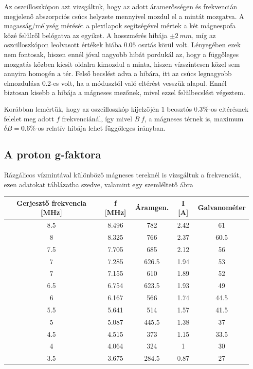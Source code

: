 \documentclass[a4paper,12pt]{article}
\begin{document}
\par Az oszcilloszkópon azt vizsgáltuk, hogy az adott áramerősségen és frekvencián megjelenő abszorpciós csúcs helyzete mennyivel mozdul el a mintát mozgatva. A magasság/mélység mérését a plexilapok segítségével mértek a két mágnespofa közé felülről belógatva az egyiket. A hosszmérés hibája $\pm 2 ~mm$, míg az oszcilloszkópon leolvasott értékek hiába $0.05$ osztás körül volt. Lényegében ezek nem fontosak, hiszen ennél jóval nagyobb hibát pordukál az, hogy a függőleges mozgatás közben kicsit oldalra kimozdul a minta, hiszen vízszintesen közel sem annyira homogén a tér. Felső becslést adva a hibára, itt az csúcs legnagyobb elmozdulása $0.2$-es volt, ha a módusztól való eltérést vesszük alapul. Ennél biztosan kisebb a hibája a mágneses mezőnek, mivel ezzel felülbecslést végeztem.
\par Korábban lemértük, hogy az oszcilloszkóp kijelzőjén 1 beosztós $0.3 \%$-os eltérésnek felelet meg adott $f$ frekvenciánál, így mivel $B ~ f$, a mágneses térnek is, maximum $\delta B = 0.6 \%$-os relatív hibája lehet függőleges irányban.

\subsection{ A proton g-faktora}

\par Rázgálicos vízmintával különböző mágneses tereknél is vizsgáltuk a frekvenciát, ezen adatokat táblázatba szedve, valamint egy szemléltető ábra

\begin{center}
\begin{tabular}{|c|c|c|c|c|}
\hline
Gerjesztő frekvencia [MHz] & f [MHz] & Áramgen. & I [A] & Galvanométer \\
\hline
8.5 & 8.496 & 782 & 2.42 & 61 \\
\hline
8 & 8.325 & 766 & 2.37 & 60.5 \\
\hline
7.5 & 7.705 & 685 & 2.12 & 56 \\
\hline
7 & 7.285 & 626.5 & 1.94 & 53 \\
\hline
7 & 7.155 & 610 & 1.89 & 52 \\
\hline
6.5 & 6.754 & 623.5 & 1.93 & 49 \\
\hline
6 & 6.167 & 566 & 1.74 & 44.5 \\
\hline
5.5 & 5.641 & 514 & 1.57 & 41.5 \\
\hline
5 & 5.087 & 445.5 & 1.38 & 37 \\
\hline
4.5 & 4.515 & 373 & 1.15 & 33.5 \\
\hline
4 & 4.064 & 324 & 1 & 30 \\
\hline
3.5 & 3.675 & 284.5 & 0.87 & 27 \\
\hline
\end{tabular}
\end{center}
\end{document}

